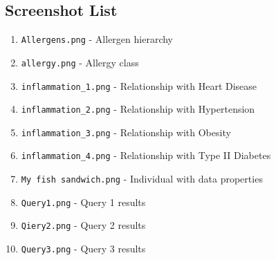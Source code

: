 \documentclass[12pt,a4paper]{article}
\begin{document}
\subsection{Screenshot List}

\begin{enumerate}
    \item \texttt{Allergens.png} - Allergen hierarchy
    \item \texttt{allergy.png} - Allergy class
    \item \texttt{inflammation\_1.png} - Relationship with Heart Disease
    \item \texttt{inflammation\_2.png} - Relationship with Hypertension
    \item \texttt{inflammation\_3.png} - Relationship with Obesity
    \item \texttt{inflammation\_4.png} - Relationship with Type II Diabetes
    \item \texttt{My fish sandwich.png} - Individual with data properties
    \item \texttt{Query1.png} - Query 1 results
    \item \texttt{Qiery2.png} - Query 2 results
    \item \texttt{Query3.png} - Query 3 results
\end{enumerate}

\end{document}
